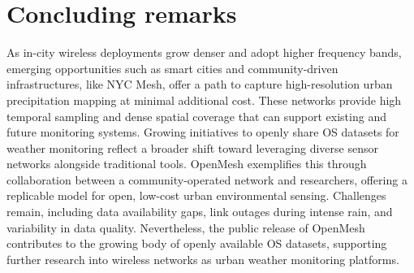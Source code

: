 \documentclass[manuscript]{copernicus}
\newif\ifshowrevisions
\newcommand{\blue}[1]{%
  \ifshowrevisions
    \textcolor{black}{#1}%
  \else
    #1%
  \fi
}
\begin{document}
\section{Concluding remarks}\label{sec:conclusion} 
As in-city wireless deployments grow denser and adopt higher frequency bands, emerging opportunities such as smart cities and community-driven infrastructures, like NYC Mesh, offer a path to capture high-resolution urban precipitation mapping at minimal additional cost. These networks provide high temporal sampling and dense spatial coverage that can support existing and future monitoring systems.
Growing initiatives to openly share OS datasets for weather monitoring reflect a broader shift toward leveraging diverse sensor networks alongside traditional tools. OpenMesh exemplifies this through collaboration between a community-operated network and researchers, offering a replicable model for open, low-cost urban environmental sensing.
Challenges remain, including data availability gaps, link outages during intense rain, and variability in data quality. Nevertheless, the public release of OpenMesh contributes to the growing body of openly available OS datasets, supporting further research into wireless networks as urban weather monitoring platforms.









\appendixfigures  %

\appendixtables   %
\end{document}
